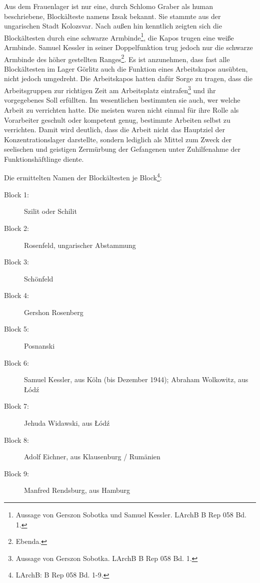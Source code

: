 Aus dem Frauenlager ist nur eine, durch Schlomo Graber als human beschriebene, Blockälteste namens Izsak bekannt. Sie stammte aus der ungarischen Stadt Kolozsvar.
\newline
Nach außen hin kenntlich zeigten sich die Blockältesten durch eine schwarze Armbinde\footnote{Aussage von Gerszon Sobotka und Samuel Kessler. LArchB B Rep 058 Bd. 1.}, die Kapos trugen eine weiße Armbinde. Samuel Kessler in seiner Doppelfunktion trug jedoch nur die schwarze Armbinde des höher gestellten Ranges\footnote{Ebenda.}.
\newline
Es ist anzunehmen, dass fast alle Blockältesten im Lager Görlitz auch die Funktion eines Arbeitskapos ausübten, nicht jedoch umgedreht. Die Arbeitskapos hatten dafür Sorge zu tragen, dass die Arbeitsgruppen zur richtigen Zeit am Arbeitsplatz eintrafen\footnote{Aussage von Gerszon Sobotka. LArchB B Rep 058 Bd. 1.} und ihr vorgegebenes Soll erfüllten. Im wesentlichen bestimmten sie auch, wer welche Arbeit zu verrichten hatte. Die meisten waren nicht einmal für ihre Rolle als Vorarbeiter geschult oder kompetent genug, bestimmte Arbeiten selbst zu verrichten. Damit wird deutlich, dass die Arbeit nicht das Hauptziel der Konzentrationslager darstellte, sondern lediglich als Mittel zum Zweck der seelischen und geistigen Zermürbung der Gefangenen unter Zuhilfenahme der Funktionshäftlinge diente.

Die ermittelten Namen der Blockältesten je Block\footnote{LArchB: B Rep 058 Bd. 1-9.}:

\begin{description} %
	\item[Block 1:] Szilit oder Schilit
	\item[Block 2:] Rosenfeld, ungarischer Abstammung
	\item[Block 3:] Schönfeld
	\item[Block 4:] Gershon Rosenberg
	\item[Block 5:] Posnanski
	\item[Block 6:] Samuel Kessler, aus Köln (bis Dezember 1944); Abraham Wolkowitz, aus \L \'od\'z
	\item[Block 7:] Jehuda Widawski, aus \L \'od\'z
	\item[Block 8:] Adolf Eichner, aus Klausenburg / Rumänien
	\item[Block 9:] Manfred Rendsburg, aus Hamburg
\end{description}
\label{blockaeltesten}


